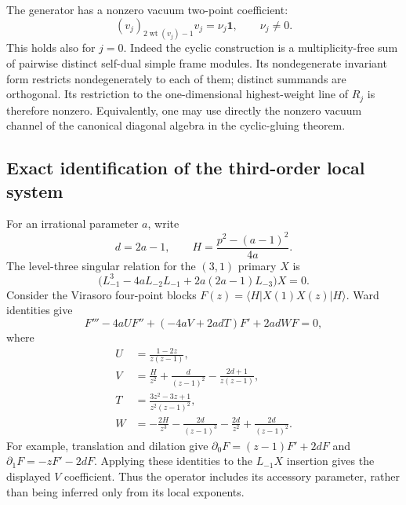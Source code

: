 \documentclass[11pt,a4paper]{article}
\numberwithin{equation}{section}
\theoremstyle{definition}\newtheorem{definition}[theorem]{Definition}
\theoremstyle{remark}\newtheorem{remark}[theorem]{Remark}
\begin{document}
The generator has a nonzero vacuum two-point coefficient:
\[
 (v_j)_{2\operatorname{wt}(v_j)-1}v_j=\nu_j\mathbf1,
 \qquad \nu_j\ne0.
\]
This holds also for $j=0$. Indeed the cyclic construction is a
multiplicity-free sum of pairwise distinct self-dual simple frame
modules. Its nondegenerate invariant form restricts nondegenerately to
each of them; distinct summands are orthogonal. Its restriction to the
one-dimensional highest-weight line of $R_j$ is therefore nonzero.
Equivalently, one may use directly the nonzero vacuum channel of the
canonical diagonal algebra in the cyclic-gluing theorem.

\subsection{Exact identification of the third-order local system}
For an irrational parameter $a$, write
\[
 d=2a-1,\qquad H=\frac{p^2-(a-1)^2}{4a}.
\]
The level-three singular relation for the $(3,1)$ primary $X$ is
\[
 \bigl(L_{-1}^3-4aL_{-2}L_{-1}+2a(2a-1)L_{-3}\bigr)X=0.
\]
Consider the Virasoro four-point blocks
$F(z)=\langle H|X(1)X(z)|H\rangle$. Ward identities give
\[
 F'''-4aU F''+(-4aV+2adT)F'+2adW F=0,
 \tag{BPZ}\label{g:eq:bpz}
\]
where
\begin{align*}
 U&=\frac{1-2z}{z(z-1)},\\
 V&=\frac{H}{z^2}+\frac{d}{(z-1)^2}
      -\frac{2d+1}{z(z-1)},\\
 T&=\frac{3z^2-3z+1}{z^2(z-1)^2},\\
 W&=-\frac{2H}{z^3}-\frac{2d}{(z-1)^3}
       -\frac{2d}{z^2}+\frac{2d}{(z-1)^2}.
\end{align*}
For example, translation and dilation give
$\partial_0F=(z-1)F'+2dF$ and
$\partial_1F=-zF'-2dF$. Applying these identities to the
$L_{-1}X$ insertion gives the displayed $V$ coefficient. Thus the
operator includes its accessory parameter, rather than being inferred
only from its local exponents.
\end{document}
